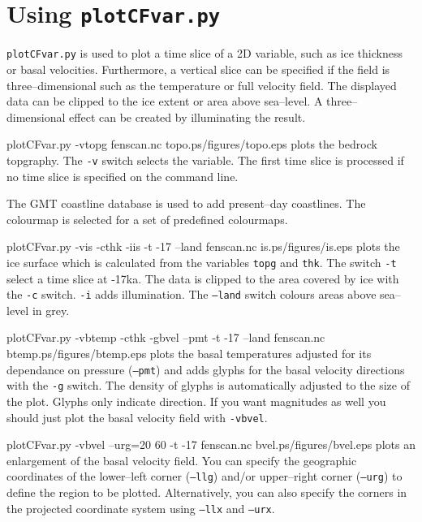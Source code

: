 \section{Using \texttt{plotCFvar.py}}
\texttt{plotCFvar.py} is used to plot a time slice of a 2D variable, such as ice thickness or basal velocities. Furthermore, a vertical slice can be specified if the field is three--dimensional such as the temperature or full velocity field. The displayed data can be clipped to the ice extent or area above sea--level. A three--dimensional effect can be created by illuminating the result.

\begin{pycf}{plotCFvar.py -vtopg fenscan.nc topo.ps}{\dir/figures/topo.eps}
plots the bedrock topgraphy. The \texttt{-v} switch selects the variable. The first time slice is processed if no time slice is specified on the command line. 

The GMT coastline database is used to add present--day coastlines. The colourmap is selected for a set of predefined colourmaps.
\end{pycf}

\begin{pycf}{plotCFvar.py -vis -cthk -iis -t -17 --land fenscan.nc is.ps}{\dir/figures/is.eps}
plots the ice surface which is calculated from the variables \texttt{topg} and \texttt{thk}. The switch \texttt{-t} select a time slice at -17ka. The data is clipped to the area covered by ice with the \texttt{-c} switch. \texttt{-i} adds illumination. The \texttt{--land} switch colours areas above sea--level in grey.
\end{pycf}

\begin{pycf}{plotCFvar.py -vbtemp -cthk -gbvel --pmt -t -17 --land fenscan.nc btemp.ps}{\dir/figures/btemp.eps}
plots the basal temperatures adjusted for its dependance on pressure (\texttt{--pmt}) and adds glyphs for the basal velocity directions with the \texttt{-g} switch. The density of glyphs is automatically adjusted to the size of the plot. Glyphs only indicate direction. If you want magnitudes as well you should just plot the basal velocity field with \texttt{-vbvel}.
\end{pycf}

\begin{pycf}{plotCFvar.py -vbvel --urg=20 60 -t -17 fenscan.nc bvel.ps}{\dir/figures/bvel.eps}
plots an enlargement of the basal velocity field. You can specify the geographic coordinates of the lower--left corner (\texttt{--llg}) and/or upper--right corner (\texttt{--urg}) to define the region to be plotted. Alternatively, you can also specify the corners in the projected coordinate system using \texttt{--llx} and \texttt{--urx}.
\end{pycf}

